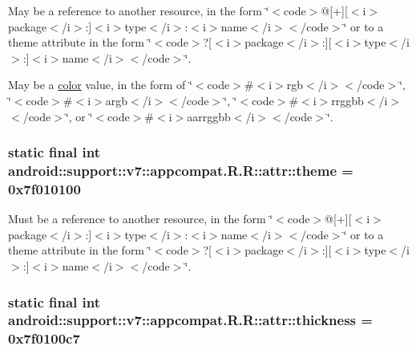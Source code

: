 May be a reference to another resource, in the form \char`\"{}$<$code$>$@\mbox{[}+\mbox{]}\mbox{[}$<$i$>$package$<$/i$>$:\mbox{]}$<$i$>$type$<$/i$>$:$<$i$>$name$<$/i$>$$<$/code$>$\char`\"{} or to a theme attribute in the form \char`\"{}$<$code$>$?\mbox{[}$<$i$>$package$<$/i$>$:\mbox{]}\mbox{[}$<$i$>$type$<$/i$>$:\mbox{]}$<$i$>$name$<$/i$>$$<$/code$>$\char`\"{}. 

May be a \hyperlink{classandroid_1_1support_1_1v7_1_1appcompat_1_1_r_1_1color}{color} value, in the form of \char`\"{}$<$code$>$\#$<$i$>$rgb$<$/i$>$$<$/code$>$\char`\"{}, \char`\"{}$<$code$>$\#$<$i$>$argb$<$/i$>$$<$/code$>$\char`\"{}, \char`\"{}$<$code$>$\#$<$i$>$rrggbb$<$/i$>$$<$/code$>$\char`\"{}, or \char`\"{}$<$code$>$\#$<$i$>$aarrggbb$<$/i$>$$<$/code$>$\char`\"{}. \hypertarget{classandroid_1_1support_1_1v7_1_1appcompat_1_1_r_1_1attr_3ed81f860c275251c36dedd4c949b1e8}{
\subsubsection[{theme}]{\setlength{\rightskip}{0pt plus 5cm}static final int android::support::v7::appcompat.R.R::attr::theme = 0x7f010100}}
\label{classandroid_1_1support_1_1v7_1_1appcompat_1_1_r_1_1attr_3ed81f860c275251c36dedd4c949b1e8}


Must be a reference to another resource, in the form \char`\"{}$<$code$>$@\mbox{[}+\mbox{]}\mbox{[}$<$i$>$package$<$/i$>$:\mbox{]}$<$i$>$type$<$/i$>$:$<$i$>$name$<$/i$>$$<$/code$>$\char`\"{} or to a theme attribute in the form \char`\"{}$<$code$>$?\mbox{[}$<$i$>$package$<$/i$>$:\mbox{]}\mbox{[}$<$i$>$type$<$/i$>$:\mbox{]}$<$i$>$name$<$/i$>$$<$/code$>$\char`\"{}. \hypertarget{classandroid_1_1support_1_1v7_1_1appcompat_1_1_r_1_1attr_55545891441023a212e569343f4ff7a9}{
\subsubsection[{thickness}]{\setlength{\rightskip}{0pt plus 5cm}static final int android::support::v7::appcompat.R.R::attr::thickness = 0x7f0100c7}}
\label{classandroid_1_1support_1_1v7_1_1appcompat_1_1_r_1_1attr_55545891441023a212e569343f4ff7a9}


